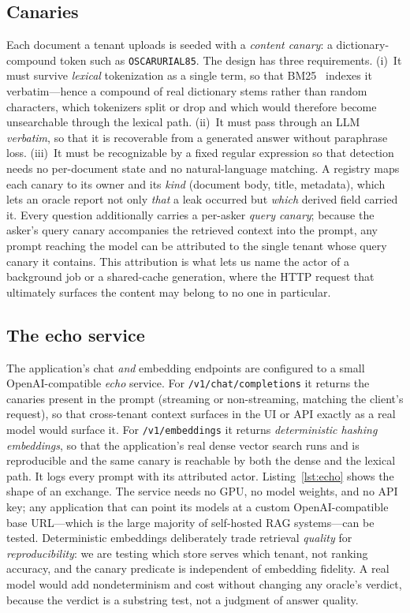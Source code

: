 \IfFileExists{IEEEtran.cls}{\documentclass[conference]{IEEEtran}}{\documentclass[10pt,twocolumn]{article}}
\newcommand{\code}[1]{\texttt{\small #1}}
\begin{document}
\subsection{Canaries}
Each document a tenant uploads is seeded with a \emph{content canary}: a dictionary-compound token
such as \code{OSCARURIAL85}. The design has three requirements. (i)~It must survive \emph{lexical}
tokenization as a single term, so that BM25~\cite{robertson2009bm25} indexes it verbatim---hence a
compound of real dictionary stems rather than random characters, which tokenizers split or drop and
which would therefore become unsearchable through the lexical path. (ii)~It must pass through an
LLM \emph{verbatim}, so that it is recoverable from a generated answer without paraphrase loss.
(iii)~It must be recognizable by a fixed regular expression so that detection needs no per-document
state and no natural-language matching. A registry maps each canary to its owner and its
\emph{kind} (document body, title, metadata), which lets an oracle report not only \emph{that} a
leak occurred but \emph{which} derived field carried it. Every question additionally carries a
per-asker \emph{query canary}; because the asker's query canary accompanies the retrieved context
into the prompt, any prompt reaching the model can be attributed to the single tenant whose query
canary it contains. This attribution is what lets us name the actor of a background job or a
shared-cache generation, where the HTTP request that ultimately surfaces the content may belong to
no one in particular.

\subsection{The echo service}
The application's chat \emph{and} embedding endpoints are configured to a small
OpenAI-compatible \emph{echo} service. For \code{/v1/chat/completions} it returns the canaries
present in the prompt (streaming or non-streaming, matching the client's request), so that
cross-tenant context surfaces in the UI or API exactly as a real model would surface it. For
\code{/v1/embeddings} it returns \emph{deterministic hashing embeddings}, so that the application's
real dense vector search runs and is reproducible and the same canary is reachable by both the dense
and the lexical path. It logs every prompt with its attributed actor. Listing~\ref{lst:echo} shows
the shape of an exchange. The service needs no GPU, no model weights, and no API key; any
application that can point its models at a custom OpenAI-compatible base URL---which is the large
majority of self-hosted RAG systems---can be tested. Deterministic embeddings deliberately trade
retrieval \emph{quality} for \emph{reproducibility}: we are testing which store serves which tenant,
not ranking accuracy, and the canary predicate is independent of embedding fidelity. A real model
would add nondeterminism and cost without changing any oracle's verdict, because the verdict is a
substring test, not a judgment of answer quality.
\end{document}
